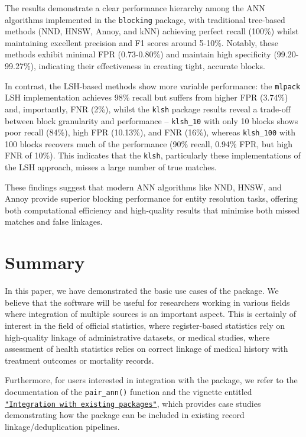 The results demonstrate a clear performance hierarchy among the ANN
algorithms implemented in the \texttt{blocking} package, with traditional
tree-based methods (NND, HNSW, Annoy, and kNN) achieving perfect recall
(100\%) whilst maintaining excellent precision and F1 scores around
5-10\%. Notably, these methods exhibit minimal FPR (0.73-0.80\%) and
maintain high specificity (99.20-99.27\%), indicating their effectiveness
in creating tight, accurate blocks.

In contrast, the LSH-based methods show more variable performance: the
\texttt{mlpack} LSH implementation achieves 98\% recall but suffers from higher
FPR (3.74\%) and, importantly, FNR (2\%), whilst the \texttt{klsh} package
results reveal a trade-off between block granularity and performance --
\texttt{klsh\_10} with only 10 blocks shows poor recall (84\%), high FPR
(10.13\%), and FNR (16\%), whereas \texttt{klsh\_100} with 100 blocks recovers
much of the performance (90\% recall, 0.94\% FPR, but high FNR of 10\%).
This indicates that the \texttt{klsh}, particularly these implementations of
the LSH approach, misses a large number of true matches.

These findings suggest that modern ANN algorithms like NND, HNSW, and
Annoy provide superior blocking performance for entity resolution tasks,
offering both computational efficiency and high-quality results that
minimise both missed matches and false linkages.

\section{Summary}\label{summary}

In this paper, we have demonstrated the basic use cases of the
 package. We believe that the software will be useful
for researchers working in various fields where integration of multiple
sources is an important aspect. This is certainly of interest in the
field of official statistics, where register-based statistics rely on
high-quality linkage of administrative datasets, or medical studies,
where assessment of health statistics relies on correct linkage of
medical history with treatment outcomes or mortality records.

Furthermore, for users interested in integration with the
 package, we refer to the documentation of the
\texttt{pair\_ann()} function and the vignette entitled
\href{https://cran.r-project.org/web/packages/blocking/vignettes/v3-integration.html}{\texttt{"Integration\ with\ existing\ packages"}},
which provides case studies demonstrating how the 
package can be included in existing record linkage/deduplication
pipelines.

